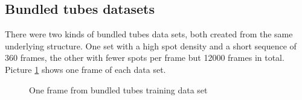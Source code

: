 \subsection{Bundled tubes datasets}
There were two kinds of bundled tubes data sets, both created from the same underlying structure. One set with a high spot density and a short sequence of 360 frames, the other with fewer spots per frame but 12000 frames in total. Picture \ref{bundledtubesHighowDensityFrame} shows one frame of each data set.\newline
\begin{figure}
\begin{minipage}[t]{0.60\textwidth}
\hfill
{}
	\caption{One frame from bundled tubes training data set}
	\label{bundledtubesHighowDensityFrame}	
\end{minipage}\hfill
\begin{minipage}[t]{0.33\textwidth}
\centering

\end{minipage}
\end{figure}

